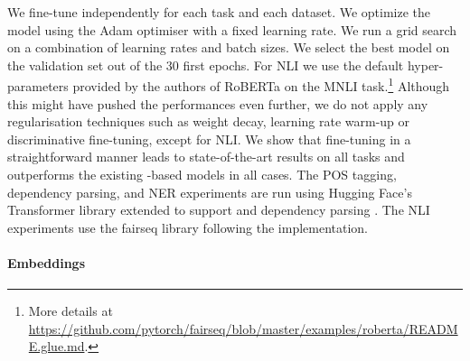 We fine-tune \camembert independently for each task and each dataset. We optimize the model using the Adam optimiser \cite{kingma2014adam} with a fixed learning rate. We run a grid search on a combination of learning rates and batch sizes. We select the best model on the validation set out of the 30 first epochs.
For NLI we use the default hyper-parameters provided by the authors of RoBERTa on the MNLI task.\footnote{More details at \url{https://github.com/pytorch/fairseq/blob/master/examples/roberta/README.glue.md}.}
Although this might have pushed the performances even further, we do not apply any regularisation techniques such as weight decay, learning rate warm-up or discriminative fine-tuning, except for NLI. We show that fine-tuning \camembert in a straightforward manner leads to state-of-the-art results on all tasks and outperforms the existing \bert-based models in all cases.
The POS tagging, dependency parsing, and NER experiments are run using Hugging Face's Transformer library extended to support \camembert and dependency parsing \cite{Wolf2019HuggingFacesTS}.
The NLI experiments use the fairseq library following the \roberta implementation.


\paragraph{Embeddings}

